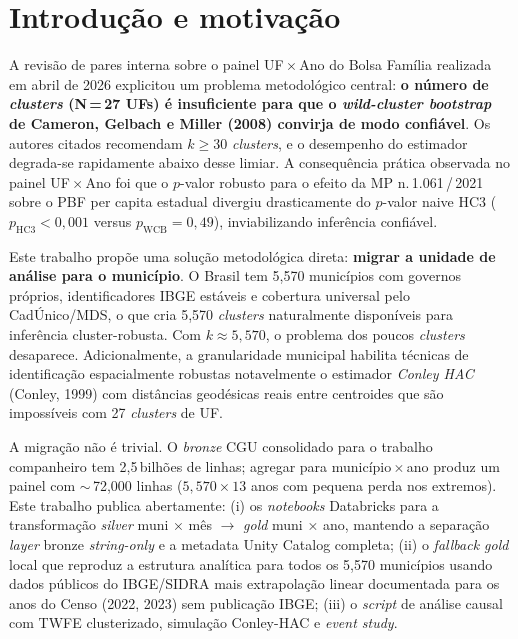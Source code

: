 \documentclass[12pt,a4paper,oneside]{article}
\begin{document}
\newpage

\renewcommand{\contentsname}{Sumário}
\tableofcontents

\newpage
\renewcommand{\listfigurename}{Lista de Figuras}
\listoffigures

\vspace{1cm}
\renewcommand{\listtablename}{Lista de Tabelas}
\listoftables

\newpage

\section{Introdução e motivação}\label{sec:intro}

A revisão de pares interna sobre o painel UF\,$\times$\,Ano do Bolsa
Família realizada em abril de 2026 explicitou um problema
metodológico central: \textbf{o número de \textit{clusters}
(N\,=\,27 UFs) é insuficiente para que o \textit{wild-cluster bootstrap}
de Cameron, Gelbach e Miller (2008) convirja de modo confiável}. Os
autores citados recomendam $k \geq 30$ \textit{clusters}, e o
desempenho do estimador degrada-se rapidamente abaixo desse limiar.
A consequência prática observada no painel UF\,$\times$\,Ano foi que o
$p$-valor robusto para o efeito da MP n.\,1.061\,/\,2021 sobre o PBF
per capita estadual divergiu drasticamente do $p$-valor naive HC3
($p_{\text{HC3}} < 0{,}001$ versus $p_{\text{WCB}} = 0{,}49$),
inviabilizando inferência confiável.

Este trabalho propõe uma solução metodológica direta: \textbf{migrar a
unidade de análise para o município}. O Brasil tem 5{,}570 municípios
com governos próprios, identificadores IBGE estáveis e cobertura
universal pelo CadÚnico/MDS, o que cria 5{,}570 \textit{clusters}
naturalmente disponíveis para inferência cluster-robusta. Com
$k \approx 5{,}570$, o problema dos poucos \textit{clusters}
desaparece. Adicionalmente, a granularidade municipal habilita técnicas
de identificação espacialmente robustas \textemdash{} notavelmente o
estimador \textit{Conley HAC} (Conley, 1999) com distâncias geodésicas
reais entre centroides \textemdash{} que são impossíveis com 27
\textit{clusters} de UF.

A migração não é trivial. O \textit{bronze} CGU consolidado para o
trabalho companheiro tem 2{,}5\,bilhões de linhas; agregar para
município\,$\times$\,ano produz um painel com $\sim$\,72{,}000 linhas
($5{,}570 \times 13$ anos com pequena perda nos extremos). Este
trabalho publica abertamente: (i) os \textit{notebooks} Databricks
para a transformação \textit{silver} muni × mês $\to$
\textit{gold} muni × ano, mantendo a separação \textit{layer} bronze
\textit{string-only} e a metadata Unity Catalog completa; (ii) o
\textit{fallback gold} local que reproduz a estrutura analítica para
todos os 5{,}570 municípios usando dados públicos do IBGE/SIDRA mais
extrapolação linear documentada para os anos do Censo (2022, 2023)
sem publicação IBGE; (iii) o \textit{script} de análise causal com
TWFE clusterizado, simulação Conley-HAC e \textit{event study}.
\end{document}
